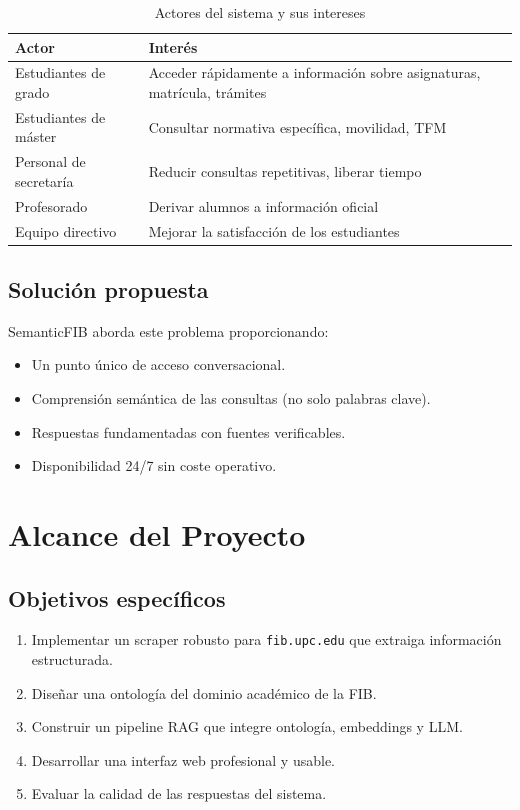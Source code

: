 \documentclass[12pt, a4paper, twoside]{report}
\begin{document}
\begin{table}[H]
\centering
\caption{Actores del sistema y sus intereses}
\label{tab:actores}
\begin{tabularx}{\textwidth}{lX}
\toprule
\textbf{Actor} & \textbf{Inter\'es} \\
\midrule
Estudiantes de grado & Acceder r\'apidamente a informaci\'on sobre asignaturas, matr\'icula, tr\'amites \\
Estudiantes de m\'aster & Consultar normativa espec\'ifica, movilidad, TFM \\
Personal de secretar\'ia & Reducir consultas repetitivas, liberar tiempo \\
Profesorado & Derivar alumnos a informaci\'on oficial \\
Equipo directivo & Mejorar la satisfacci\'on de los estudiantes \\
\bottomrule
\end{tabularx}
\end{table}

\section{Soluci\'on propuesta}

SemanticFIB aborda este problema proporcionando:

\begin{itemize}
  \item Un punto \'unico de acceso conversacional.
  \item Comprensi\'on sem\'antica de las consultas (no solo palabras clave).
  \item Respuestas fundamentadas con fuentes verificables.
  \item Disponibilidad 24/7 sin coste operativo.
\end{itemize}


\chapter{Alcance del Proyecto}
\label{ch:alcance}

\section{Objetivos espec\'ificos}

\begin{enumerate}
  \item Implementar un scraper robusto para \texttt{fib.upc.edu} que extraiga informaci\'on estructurada.
  \item Dise\~nar una ontolog\'ia del dominio acad\'emico de la FIB.
  \item Construir un pipeline RAG que integre ontolog\'ia, embeddings y LLM.
  \item Desarrollar una interfaz web profesional y usable.
  \item Evaluar la calidad de las respuestas del sistema.
\end{enumerate}
\end{document}
